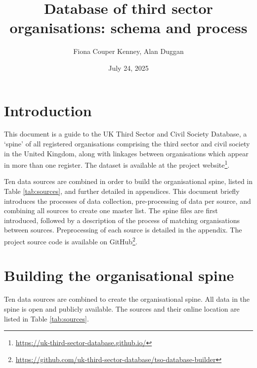 \documentclass{article}
\title{Database of third sector organisations: schema and process}
\author{Fiona Couper Kenney, Alan Duggan}
\date{July 24, 2025}
\begin{document}
\maketitle
\section{Introduction}
This document is a guide to the UK Third Sector and Civil Society Database, a ‘spine’ of all 
registered organisations comprising the third sector and civil society in the United Kingdom, along with 
linkages between organisations which appear in more than one register. The dataset is available at the project website\footnote{\url{https://uk-third-sector-database.github.io/}}.

Ten data sources are combined in order to build the organisational spine, listed in Table \ref{tab:sources}, and further detailed in appendices. 
This document briefly introduces the processes of data collection, pre-processing of 
data per source, and combining all sources to create one master list.  The spine files are first introduced, followed by a description of the process of matching organisations between sources. 
Preprocessing of each source is detailed in the appendix. The project source code is available on GitHub\footnote{\url{https://github.com/uk-third-sector-database/tso-database-builder}}.

\section{Building the organisational spine}

Ten data sources are combined to create the organisational spine. All data in the spine is open and publicly available. The sources and 
their online location are listed in Table \ref{tab:sources}. 
\end{document}
